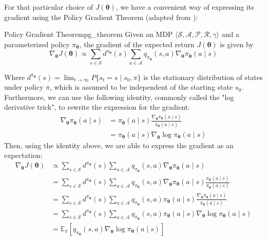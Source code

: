 For that particular choice of $J(\boldsymbol\theta)$, we have a convenient way of expressing its gradient using the Policy Gradient Theorem (adapted from \cite{NIPS1999_464d828b}):
\begin{theorem}{Policy Gradient Theorem}{pg_theorem}
    Given an MDP $\langle \mathcal{S}, \mathcal{A}, \mathcal{P}, \mathcal{R}, \gamma \rangle$ and a parameterized policy $\pi_{\boldsymbol\theta}$, the gradient of the expected return $J(\boldsymbol\theta)$ is given by
    \begin{equation}
        \nabla_{\boldsymbol\theta} J(\boldsymbol\theta) \propto \sum_{s \in \mathcal{S}} d^{\pi_{\boldsymbol\theta}}(s) \sum_{a \in \mathcal{A}} q_{\pi_{\boldsymbol\theta}}(s, a) \nabla_{\boldsymbol\theta}\pi_{\boldsymbol\theta}(a \mid s)
    \end{equation}
\end{theorem}
Where $d^{\pi_{\boldsymbol\theta}}(s) = \lim_{t \to \infty} P\{s_t = s \mid s_0, \pi\}$ is the stationary distribution of states under policy $\pi$, which is assumed to be independent of the starting state $s_0$. Furthermore, we can use the following identity, commonly called the "log derivative trick", to rewrite the expression for the gradient:
\begin{align*}
    \nabla_{\boldsymbol\theta}\pi_{\boldsymbol\theta}(a \mid s) &= \pi_{\boldsymbol\theta}(a \mid s)\frac{\nabla_{\boldsymbol\theta}\pi_{\boldsymbol\theta}(a \mid s)}{\pi_{\boldsymbol\theta}(a \mid s)} \\ 
     &= \pi_{\boldsymbol\theta}(a \mid s)\nabla_{\boldsymbol\theta}\log{\pi_{\boldsymbol\theta}(a \mid s)}
\end{align*}
Then, using the identity above, we are able to express the gradient as an expectation:
\begin{align}
    \nabla_{\boldsymbol\theta} J(\boldsymbol\theta) &\propto \sum_{s \in \mathcal{S}} d^{\pi_{\boldsymbol\theta}}(s) \sum_{a \in \mathcal{A}} q_{\pi_{\boldsymbol\theta}}(s, a) \nabla_{\boldsymbol\theta}\pi_{\boldsymbol\theta}(a \mid s)\\
    &= \sum_{s \in \mathcal{S}} d^{\pi_{\boldsymbol\theta}}(s) \sum_{a \in \mathcal{A}} q_{\pi_{\boldsymbol\theta}}(s, a) \nabla_{\boldsymbol\theta}\pi_{\boldsymbol\theta}(a \mid s)\frac{\pi_{\boldsymbol\theta}(a \mid s)}{\pi_{\boldsymbol\theta}(a \mid s)}\nonumber\\
    &= \sum_{s \in \mathcal{S}} d^{\pi_{\boldsymbol\theta}}(s) \sum_{a \in \mathcal{A}} q_{\pi_{\boldsymbol\theta}}(s, a) \pi_{\boldsymbol\theta}(a \mid s)\frac{\nabla_{\boldsymbol\theta}\pi_{\boldsymbol\theta}(a \mid s)}{\pi_{\boldsymbol\theta}(a \mid s)}\nonumber\\
    &= \sum_{s \in \mathcal{S}} d^{\pi_{\boldsymbol\theta}}(s) \sum_{a \in \mathcal{A}} q_{\pi_{\boldsymbol\theta}}(s, a) \pi_{\boldsymbol\theta}(a \mid s)\nabla_{\boldsymbol\theta}\log{\pi_{\boldsymbol\theta}(a \mid s)}\nonumber\\
    &= \mathbb{E}_\pi[q_{\pi_{\boldsymbol\theta}}(s, a)\nabla_{\boldsymbol\theta}\log{\pi_{\boldsymbol\theta}(a \mid s)}] \label{eq:grad-log-prob}
\end{align}
